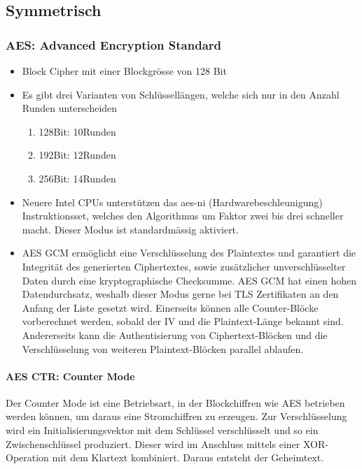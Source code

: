 \subsection{Symmetrisch}
\subsubsection{AES: Advanced Encryption Standard}
\begin{itemize}
	\item Block Cipher mit einer Blockgrösse von 128 Bit
	\item Es gibt drei Varianten von Schlüssellängen, welche sich nur in den Anzahl Runden unterscheiden
	\begin{enumerate}
		\item 128Bit: 10Runden
		\item 192Bit: 12Runden
		\item 256Bit: 14Runden
	\end{enumerate}
	\item Neuere Intel CPUs unterstützen das \gls{aes-ni} (Hardwarebeschleunigung) Instruktionsset, welches den Algorithmus um Faktor zwei bis drei schneller macht. Dieser Modus ist standardmässig aktiviert.
	\item AES GCM ermöglicht eine Verschlüsselung des Plaintextes und garantiert die Integrität des generierten Ciphertextes, sowie zusätzlicher unverschlüsselter Daten durch eine kryptographische Checksumme. AES GCM hat einen hohen Datendurchsatz, weshalb dieser Modus gerne bei TLS Zertifikaten an den Anfang der Liste gesetzt wird.  Einerseits können alle Counter-Blöcke vorberechnet werden, sobald der IV und die Plaintext-Länge bekannt sind. Andererseits kann die Authentisierung von Ciphertext-Blöcken und die Verschlüsselung von weiteren Plaintext-Blöcken parallel ablaufen.
\end{itemize}

\paragraph{AES CTR: Counter Mode}
Der Counter Mode ist eine Betriebsart, in der Blockchiffren wie AES betrieben werden können, um daraus eine Stromchiffren zu erzeugen. Zur Verschlüsselung wird ein Initialisierungsvektor mit dem Schlüssel verschlüsselt und so ein Zwischenschlüssel produziert. Dieser wird im Anschluss mittels einer XOR-Operation mit dem Klartext kombiniert. Daraus entsteht der Geheimtext.



